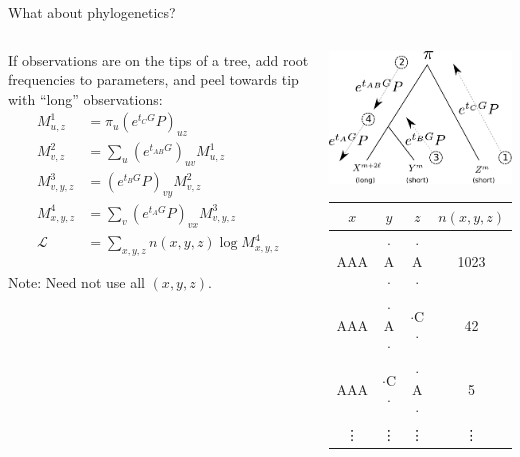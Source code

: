 \documentclass[smaller]{beamer}
\begin{document}
\begin{frame}{What about phylogenetics?}

  \begin{columns}[c]
    \begin{column}{.5\textwidth}

  If observations are on the tips of a tree, 
  add root frequencies to parameters,
  and peel towards tip with ``long'' observations:
  \begin{align*}
    M^1_{u,z} &= \pi_u \left( e^{t_C G} P \right)_{uz} \\
    M^2_{v,z} &= \sum_u \left( e^{t_{AB} G} \right)_{uv} M^1_{u,z} \\
    M^3_{v,y,z} &= \left( e^{t_B G} P \right)_{vy} M^2_{v,z} \\
    M^4_{x,y,z} &= \sum_v \left( e^{t_A G} P \right)_{vx} M^3_{v,y,z} \\
    \mathcal{L} &= \sum_{x,y,z} n(x,y,z) \log M^4_{x,y,z}
  \end{align*}

  \vspace{1em}

  {\newthing Note:} Need not use all $(x,y,z)$.

    \end{column}
    \begin{column}{.5\textwidth}

  \includegraphics[width=\textwidth]{../../peeling-schematic}

  \vspace{2em}

  \begin{center}
  \small
  \begin{tabular}{cccc}
    $x$ & $y$ & $z$ & $n(x,y,z)$ \\
    \hline
    AAA & $\cdot$A$\cdot$ & $\cdot$A$\cdot$ & 1023 \\
    AAA & $\cdot$A$\cdot$ & $\cdot$C$\cdot$ & 42 \\
    AAA & $\cdot$C$\cdot$ & $\cdot$A$\cdot$ & 5  \\
    \vdots & \vdots & \vdots & \vdots 
  \end{tabular}
  \end{center}


\end{column}
\end{columns}
\end{frame}
\end{document}
